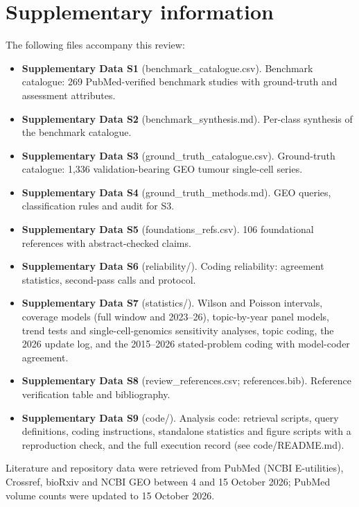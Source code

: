 \documentclass[11pt]{article}
\providecommand{\tightlist}{\setlength{\itemsep}{0pt}\setlength{\parskip}{0pt}}
\begin{document}
\section{Supplementary information}\label{supplementary-information}

The following files accompany this review:

\begin{itemize}
\tightlist
\item
  \textbf{Supplementary Data S1} (benchmark\_catalogue.csv). Benchmark
  catalogue: 269 PubMed-verified benchmark studies with ground-truth and
  assessment attributes.
\item
  \textbf{Supplementary Data S2} (benchmark\_synthesis.md). Per-class
  synthesis of the benchmark catalogue.
\item
  \textbf{Supplementary Data S3} (ground\_truth\_catalogue.csv).
  Ground-truth catalogue: 1,336 validation-bearing GEO tumour
  single-cell series.
\item
  \textbf{Supplementary Data S4} (ground\_truth\_methods.md). GEO
  queries, classification rules and audit for S3.
\item
  \textbf{Supplementary Data S5} (foundations\_refs.csv). 106
  foundational references with abstract-checked claims.
\item
  \textbf{Supplementary Data S6} (reliability/). Coding reliability:
  agreement statistics, second-pass calls and protocol.
\item
  \textbf{Supplementary Data S7} (statistics/). Wilson and Poisson
  intervals, coverage models (full window and 2023--26), topic-by-year
  panel models, trend tests and single-cell-genomics sensitivity
  analyses, topic coding, the 2026 update log, and the 2015--2026
  stated-problem coding with model-coder agreement.
\item
  \textbf{Supplementary Data S8} (review\_references.csv;
  references.bib). Reference verification table and bibliography.
\item
  \textbf{Supplementary Data S9} (code/). Analysis code: retrieval
  scripts, query definitions, coding instructions, standalone statistics
  and figure scripts with a reproduction check, and the full execution
  record (see code/README.md).
\end{itemize}

Literature and repository data were retrieved from PubMed (NCBI
E-utilities), Crossref, bioRxiv and NCBI GEO between 4 and 15 October
2026; PubMed volume counts were updated to 15 October 2026.
\end{document}
